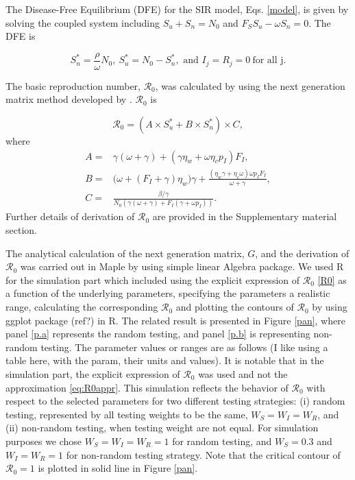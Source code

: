 \documentclass[12pt]{article}
\newcommand{\Rnum}{\mathcal{R}_0}
\theoremstyle{definition} %
\begin{document}
The Disease-Free Equilibrium (DFE) for the SIR model, Eqs. \eqref{model}, is given by solving the coupled system including $S_u+S_n=N_0$ and $F_S S_u-\omega S_n=0$. The DFE is

\begin{equation}
\label{dfe}
S_n^*= \frac{\rho}{\omega} N_0, \ S_u^*= N_0-S_n^*, \text{~and~} I_j=R_j=0 \ \text{for all j}.
\end{equation}

The basic reproduction number, $\Rnum$, was calculated by using the next generation matrix method developed by \cite{van2002reproduction}. $\Rnum$ is

\begin{equation}
\label{R0}
\Rnum= (A \times S_u^* + B \times S_n^*) \times C, 
\end{equation}
where
\begin{equation}
\begin{aligned}
\label{eq:abc}
A=& \gamma(\omega+\gamma) + (\gamma \eta_w + \omega \eta_c p_I) F_I, \\
B=& \big(\omega+(F_I+\gamma)\eta_w\big) \gamma+\frac{(\eta_w \gamma+ \eta_c\omega) \omega p_I F_I }{\omega+\gamma}, \\ 
C=& \frac{\beta/\gamma}{N_0 (\gamma(\omega+\gamma)+F_I(\gamma+\omega p_I))}.
\end{aligned}
\end{equation}
Further details of derivation of $\Rnum$ are provided in the Supplementary material section.
 
The analytical calculation of the next generation matrix, $G$, and the derivation of $\Rnum$ was carried out in Maple \citep{maple14} by using simple linear Algebra package. 
  We used R \citep{r} for the simulation part which included using the explicit expression of $\Rnum$ \ref{R0} as a function of the underlying parameters, specifying the parameters a realistic range, calculating the corresponding $\Rnum$ and plotting the contours of $\Rnum$ by using ggplot package (ref?) in R. The related result is presented in Figure \ref{pan}, where  panel \eqref{p.a} represents the random testing, and panel \eqref{p.b} is representing non-random testing. The parameter values or ranges are as follows (I like using a table here, with the param, their units and values). It is notable that in the simulation part, the explicit expression of $\Rnum$ was used and not the approximation \eqref{eq:R0appr}. This simulation reflects the behavior of $\Rnum$ with respect to the selected parameters for two different testing strategies: (i) random testing, represented by all testing weights to be the same, $W_S=W_I=W_R$, and (ii) non-random testing, when testing weight are not equal. For simulation purposes we chose $W_S=W_I=W_R=1$ for random testing, and $W_S=0.3$ and $W_I=W_R=1$ for non-random testing strategy. Note that the critical contour of $\Rnum=1$ is plotted in solid line in Figure \ref{pan}. 
\end{document}
